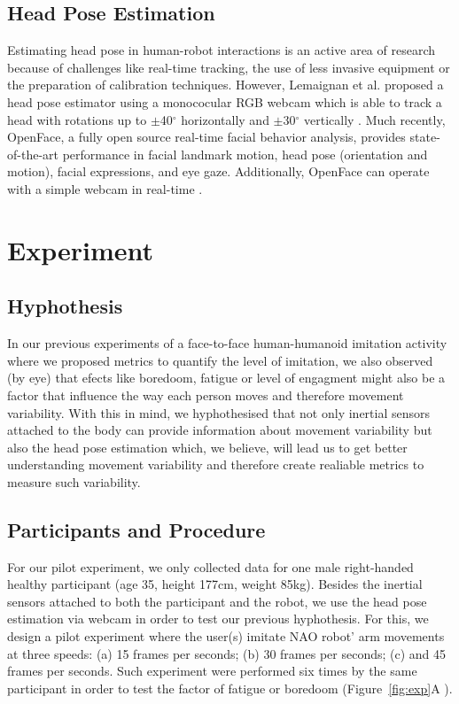 \documentclass{sigchi}
\begin{document}
\subsection{Head Pose Estimation}

Estimating head pose in human-robot interactions is an active area of research
because of challenges like real-time tracking, the use of less invasive equipment
or the preparation of calibration techniques. However, Lemaignan et al. proposed a head pose estimator
using a monococular RGB webcam which is able to track a head with rotations up
to $\pm$40$^{\circ}$ horizontally and $\pm$30$^{\circ}$ vertically \cite{Lemaignan2016}.
Much recently, OpenFace, a fully open source real-time facial behavior analysis,
provides state-of-the-art performance in facial landmark motion,
head pose (orientation and motion), facial expressions, and eye gaze.
Additionally, OpenFace can operate with a simple webcam in real-time
\cite{Baltrusaitis2016}.



\section{Experiment}


\subsection{Hyphothesis}
In our previous experiments of a face-to-face human-humanoid imitation
activity \cite{XXX2017} where we proposed metrics to quantify the level of
imitation, we also observed (by eye) that efects like boredoom, fatigue or
level of engagment might also be a factor that influence
the way each person moves and therefore movement variability.
With this in mind, we hyphothesised that not only inertial sensors attached
to the body can provide information about movement variability
but also the head pose estimation which, we believe, will lead us to get better
understanding movement variability and therefore create
realiable metrics to measure such variability.


\subsection{Participants and Procedure}
For our pilot experiment, we only collected data for one male right-handed healthy
participant  (age 35, height 177cm, weight 85kg).
Besides the inertial sensors attached to both the participant and the robot,
we use the head pose estimation via webcam in order to test our previous hyphothesis.
For this, we design a pilot experiment where the user(s) imitate NAO robot' arm
movements at three speeds:
(a) 15 frames per seconds;
(b) 30 frames per seconds;
(c) and 45 frames per seconds.
Such experiment were performed six times by the same participant in order to
test the factor of fatigue or boredoom (Figure~\ref{fig:exp}A ).
\end{document}
